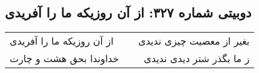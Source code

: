 \begin{center}
\section*{دوبیتی شماره ۳۲۷: از آن روزیکه ما را آفریدی}
\label{sec:327}
\begin{longtable}{l p{0.5cm} r}
از آن روزیکه ما را آفریدی
&&
بغیر از معصیت چیزی ندیدی
\\
خداوندا بحق هشت و چارت
&&
ز ما بگذر شتر دیدی ندیدی
\\
\end{longtable}
\end{center}
